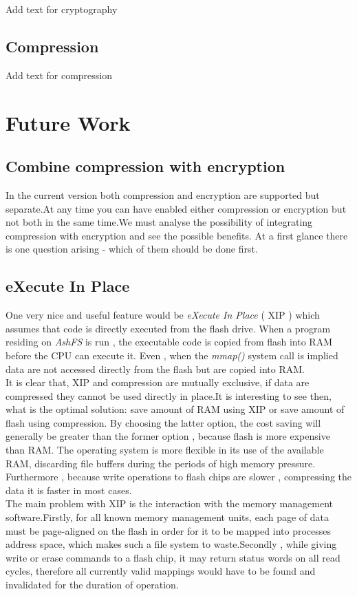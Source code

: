 \documentclass[conference]{IEEEtran}
\begin{document}
Add text for cryptography

\subsection{Compression}
Add text for compression

\section{Future Work}


\subsection{Combine compression with encryption}
In the current version both compression and encryption are supported but separate.At any time you can have 
enabled either compression or encryption but not both in the same time.We must analyse the possibility of 
integrating compression with encryption and see the possible benefits. At a first glance there is one question arising - which of them should be 
done first. 
\subsection{eXecute In Place}
One very nice and useful feature would be {\em eXecute In Place} ( XIP ) which assumes that code is
directly executed from the flash drive. When a program residing on {\em AshFS } is run , the executable
code is copied from flash into RAM before the CPU can execute it. Even , when the {\em mmap() } system 
call is implied data are not accessed directly from the flash but are copied into RAM. \\

It is clear that, XIP and compression are mutually exclusive, if data are compressed they cannot be 
used directly in place.It is interesting to see then, what is the optimal solution: save amount of RAM using
XIP or save amount of flash using compression. By choosing the latter option, the cost saving will generally 
be greater than the former option , because flash is more expensive than RAM. The operating system is more 
flexible in its use of the available RAM, discarding file buffers during the periods of high memory pressure.
Furthermore , because write operations to flash chips are slower , compressing the  data it is faster in most 
cases.\\

The main problem with XIP is the interaction with the memory management software.Firstly, for all known memory 
management units, each page of data must be page-aligned on the flash in order for it to be mapped into 
processes address space, which makes such a file system to waste.Secondly , while giving write or erase 
commands to a flash chip, it may return status words on all read cycles, therefore all currently valid mappings
would have to be found and invalidated for the duration of operation.
\end{document}
